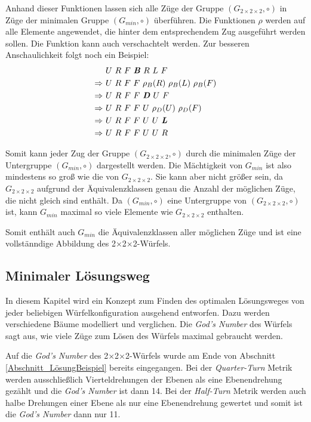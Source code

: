 \documentclass[12pt,a4paper, usenames, dvipsnames]{article}
\theoremstyle{mystyle}
\theoremstyle{definition}
\newcommand{\Gtwo}{\ensuremath{G_{2\times 2\times 2}}}
\newcommand{\Ttwo}{2$\times$2$\times$2-}
\begin{document}
Anhand dieser Funktionen lassen sich alle Züge der Gruppe $(\Gtwo, \circ)$ in Züge der minimalen Gruppe $(G_{min}, \circ)$ überführen. Die Funktionen $\rho$ werden auf alle Elemente angewendet, die hinter dem entsprechendem Zug ausgeführt werden sollen. Die Funktion kann auch verschachtelt werden. Zur besseren Anschaulichkeit folgt noch ein Beispiel:
\begin{align*}
& U \ R \ F \ \textbf{\textit{B}} \ R \ L \ F  \\ 
\Rightarrow \ & U \ R \ F \ F \ \rho_B(R) \ \rho_B(L) \ \rho_B(F) \\
\Rightarrow \ & U \ R \ F \ F \ \textbf{\textit{D}} \ U \ F \\
\Rightarrow \ & U \ R \ F \ F \ U \ \rho_D(U) \ \rho_D(F) \\
\Rightarrow  \ & U \ R \ F \ F \ U \ U \ \textbf{\textit{L}} \\
\Rightarrow \ & U \ R \ F \ F \ U \ U \ R
\end{align*}

Somit kann jeder Zug der Gruppe $(\Gtwo, \circ)$ durch die minimalen Züge der Untergruppe  $(G_{min}, \circ)$ dargestellt werden. Die Mächtigkeit von $G_{min}$ ist also mindestens so groß wie die von $\Gtwo$. Sie kann aber nicht größer sein, da $\Gtwo$ aufgrund der Äquivalenzklassen genau die Anzahl der möglichen Züge, die nicht gleich sind enthält. Da $(G_{min}, \circ)$ eine Untergruppe von $(\Gtwo, \circ)$ ist, kann $G_{min}$ maximal so viele Elemente wie $\Gtwo$ enthalten.

Somit enthält auch $G_{min}$ die Äquivalenzklassen aller möglichen Züge und ist eine vollstänndige Abbildung des \Ttwo Würfels.

%
%
%
%
%
%
%
%
%
%
%
%
%
%
%
%
%
%
\subsection{Minimaler Lösungsweg}

\label{Abschnitt_MinLösung}

In diesem Kapitel wird ein Konzept zum Finden des optimalen Lösungsweges von jeder beliebigen Würfelkonfiguration ausgehend entworfen. Dazu werden verschiedene Bäume modelliert und verglichen. Die \textit{God's Number} des Würfels sagt aus, wie viele Züge zum Lösen des Würfels maximal gebraucht werden.

Auf die \textit{God's Number} des \Ttwo Würfels wurde am Ende von Abschnitt \ref{Abschnitt_LösungBeispiel} bereits eingegangen. Bei der \textit{Quarter-Turn} Metrik werden ausschließlich Vierteldrehungen der Ebenen als eine Ebenendrehung gezählt und die \textit{God's Number} ist dann 14. Bei der \textit{Half-Turn} Metrik werden auch halbe Drehungen einer Ebene als nur eine Ebenendrehung gewertet und somit ist die \textit{God's Number} dann nur 11.
\end{document}
